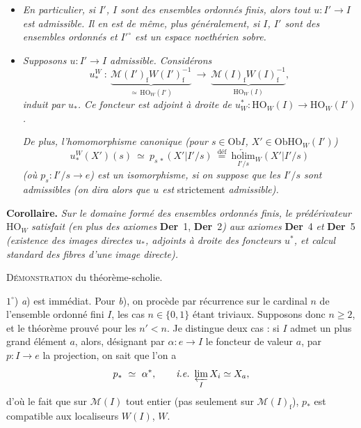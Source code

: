 \documentclass[11pt]{article}
\newcommand{\printedpage}[1]{\marginpar{\footnotesize p.~#1}}
\newcommand{\msp}[1]{\marginpar{\footnotesize [#1]}}
\newcommand{\cM}{\mathcal{M}}
\newcommand{\HO}{\mathrm{HO}}
\newcommand{\Ob}{\mathrm{Ob}}
\newcommand{\rf}{\mathrm{f}}
\begin{document}
\printedpage{34}

\begin{itemize}[leftmargin=3em]
\item[c)] \textit{En particulier, si $I'$, $I$ sont des ensembles ordonnés finis, alors tout $u : I' \longrightarrow I$ est admissible. Il en est de même, plus généralement, si $I$, $I'$ sont des ensembles ordonnés et $I'^{\circ}$ est un espace noethérien sobre.}
\end{itemize}

\begin{itemize}[leftmargin=2em]
\item[2)] \textit{Supposons $u : I' \longrightarrow I$ admissible. Considérons}
\[
u_*^W \ : \ \underbrace{\cM(I')_{\rf}W(I')_{\rf}^{-1}}_{\simeq\, \HO_W(I')} \ \longrightarrow \ \underbrace{\cM(I)_{\rf}W(I)_{\rf}^{-1}}_{\HO_W(I)},
\]
\textit{induit par $u_*$. Ce foncteur est adjoint à droite de $u_W^* : \HO_W(I) \longrightarrow \HO_W(I')$.}

\msp{page 61}
\textit{De plus, l'homomorphisme canonique (pour $s \in \Ob I$, $X' \in \Ob \HO_W(I')$)}
\[
u_*^W(X')(s) \ \simeq \ p_{s\,*}(X'|I'/s) \ \overset{\text{déf}}{=} \ \underset{I'/s}{\underleftarrow{\mathrm{holim}}}{}_W(X'|I'/s)
\]
\textit{(où $p_s : I'/s \longrightarrow e$) est un isomorphisme, si on suppose que les $I'/s$ sont admissibles (on dira alors que $u$ est} strictement \textit{admissible).}
\end{itemize}

\textbf{Corollaire.} \textit{Sur le domaine formé des ensembles ordonnés finis, le prédérivateur} $\HO_W$ \textit{satisfait (en plus des axiomes} \textbf{Der}~1, \textbf{Der}~2\textit{) aux axiomes} \textbf{Der}~4 \textit{et} \textbf{Der}~5 \textit{(existence des images directes $u_*$, adjoints à droite des foncteurs $u^*$, et calcul standard des fibres d'une image directe).}

\textsc{Démonstration} du théorème-scholie.

$1^\circ$) \textit{a}) est immédiat. Pour \textit{b}), on procède par récurrence sur le cardinal $n$ de l'ensemble ordonné fini $I$, les cas $n \in \{0,1\}$ étant triviaux. Supposons donc $n \geq 2$, et le théorème prouvé pour les $n' < n$. Je distingue deux cas : si $I$ admet un plus grand élément $a$, alors, désignant par $\alpha : e \longrightarrow I$ le foncteur de valeur $a$, par $p : I \longrightarrow e$ la projection, on sait que l'on a
\[
p_* \ \simeq \ \alpha^*, \qquad \textit{i.e.} \ \varprojlim_{I} X_i \simeq X_a,
\]
d'où le fait que sur $\cM(I)$ tout entier
\msp{page 62}
(pas seulement sur $\cM(I)_{\rf}$), $p_*$ est compatible aux localiseurs $W(I)$, $W$.
\end{document}
